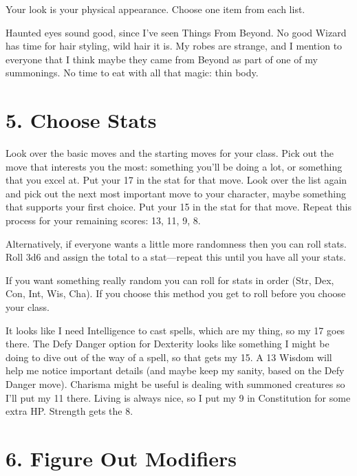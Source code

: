 Your look is your physical appearance. Choose one item from each list.

       
\startExample
Haunted eyes sound good, since I've seen Things From Beyond. No good Wizard has time for hair styling, wild hair it is. My robes are strange, and I mention to everyone that I think maybe they came from Beyond as part of one of my summonings. No time to eat with all that magic: thin body.
\stopExample
       
\section{5. Choose Stats}     
       

Look over the basic moves and the starting moves for your class. Pick out the move that interests you the most: something you'll be doing a lot, or something that you excel at. Put your 17 in the stat for that move. Look over the list again and pick out the next most important move to your character, maybe something that supports your first choice. Put your 15 in the stat for that move. Repeat this process for your remaining scores: 13, 11, 9, 8.

       

Alternatively, if everyone wants a little more randomness then you can roll stats. Roll 3d6 and assign the total to a stat—repeat this until you have all your stats.

       

If you want something really random you can roll for stats in order (Str, Dex, Con, Int, Wis, Cha). If you choose this method you get to roll before you choose your class.

       
\startExample
It looks like I need Intelligence to cast spells, which are my thing, so my 17 goes there. The Defy Danger option for Dexterity looks like something I might be doing to dive out of the way of a spell, so that gets my 15. A 13 Wisdom will help me notice important details (and maybe keep my sanity, based on the Defy Danger move). Charisma might be useful is dealing with summoned creatures so I'll put my 11 there. Living is always nice, so I put my 9 in Constitution for some extra HP. Strength gets the 8.
\stopExample
       
\section{6. Figure Out Modifiers}     
       

